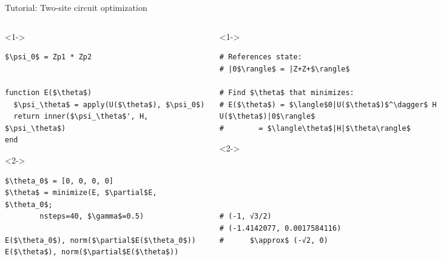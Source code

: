 \begin{frame}[fragile]{Tutorial: Two-site circuit optimization}


\begin{columns}

\begin{column}{5cm}

\begin{onlyenv}<1->

\begin{lstlisting}[language=JuliaLocal, style=julia, mathescape, basicstyle=\small]
$\psi_0$ = Zp1 * Zp2


function E($\theta$)
  $\psi_\theta$ = apply(U($\theta$), $\psi_0$)
  return inner($\psi_\theta$', H, $\psi_\theta$)
end
\end{lstlisting}

\end{onlyenv}

\begin{onlyenv}<2->

\begin{lstlisting}[language=JuliaLocal, style=julia, mathescape, basicstyle=\small]
$\theta_0$ = [0, 0, 0, 0]
$\theta$ = minimize(E, $\partial$E, $\theta_0$;
        nsteps=40, $\gamma$=0.5)

E($\theta_0$), norm($\partial$E($\theta_0$))
E($\theta$), norm($\partial$E($\theta$))
 \end{lstlisting}

\end{onlyenv}

\end{column}

\begin{column}{5cm}

\begin{onlyenv}<1->

\begin{lstlisting}[style=julia, numbers=none, mathescape, basicstyle=\small]
# References state:
# |0$\rangle$ = |Z+Z+$\rangle$

# Find $\theta$ that minimizes:
# E($\theta$) = $\langle$0|U($\theta$)$^\dagger$ H U($\theta$)|0$\rangle$
#        = $\langle\theta$|H|$\theta\rangle$
 \end{lstlisting}

\end{onlyenv}

\begin{onlyenv}<2->

\begin{lstlisting}[style=julia, numbers=none, mathescape, basicstyle=\small]




# (-1, √3/2)
# (-1.4142077, 0.0017584116)
#      $\approx$ (-√2, 0)
\end{lstlisting}

\end{onlyenv}

\end{column}

\end{columns}

\end{frame}
